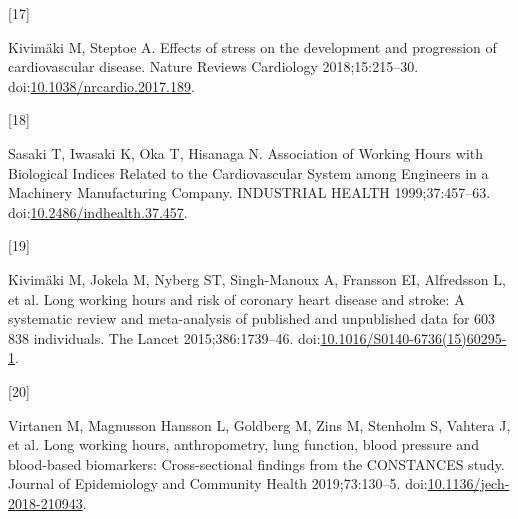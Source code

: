 \documentclass[]{elsarticle} %
\newlength{\cslhangindent}
\newlength{\csllabelwidth}
\newenvironment{CSLReferences}[2] %
 {%
  \setlength{\parindent}{0pt}
  \ifodd #1 \everypar{\setlength{\hangindent}{\cslhangindent}}\ignorespaces\fi
  \ifnum #2 > 0
  \setlength{\parskip}{#2\baselineskip}
  \fi
 }%
 {}
\newcommand{\CSLLeftMargin}[1]{\parbox[t]{\csllabelwidth}{#1}}
\newcommand{\CSLRightInline}[1]{\parbox[t]{\linewidth - \csllabelwidth}{#1}\break}
\begin{document}
\begin{CSLReferences}{0}{0}
\leavevmode{}%
\CSLLeftMargin{{[}17{]} }
\CSLRightInline{Kivimäki M, Steptoe A. Effects of stress on the
development and progression of cardiovascular disease. Nature Reviews
Cardiology 2018;15:215--30.
doi:\href{https://doi.org/10.1038/nrcardio.2017.189}{10.1038/nrcardio.2017.189}.}

\leavevmode{}%
\CSLLeftMargin{{[}18{]} }
\CSLRightInline{Sasaki T, Iwasaki K, Oka T, Hisanaga N. Association of
{Working Hours} with {Biological Indices Related} to the {Cardiovascular
System} among {Engineers} in a {Machinery Manufacturing Company}.
INDUSTRIAL HEALTH 1999;37:457--63.
doi:\href{https://doi.org/10.2486/indhealth.37.457}{10.2486/indhealth.37.457}.}

\leavevmode{}%
\CSLLeftMargin{{[}19{]} }
\CSLRightInline{Kivimäki M, Jokela M, Nyberg ST, Singh-Manoux A,
Fransson EI, Alfredsson L, et al. Long working hours and risk of
coronary heart disease and stroke: A systematic review and meta-analysis
of published and unpublished data for 603 838 individuals. The Lancet
2015;386:1739--46.
doi:\href{https://doi.org/10.1016/S0140-6736(15)60295-1}{10.1016/S0140-6736(15)60295-1}.}

\leavevmode{}%
\CSLLeftMargin{{[}20{]} }
\CSLRightInline{Virtanen M, Magnusson Hansson L, Goldberg M, Zins M,
Stenholm S, Vahtera J, et al. Long working hours, anthropometry, lung
function, blood pressure and blood-based biomarkers: Cross-sectional
findings from the {CONSTANCES} study. Journal of Epidemiology and
Community Health 2019;73:130--5.
doi:\href{https://doi.org/10.1136/jech-2018-210943}{10.1136/jech-2018-210943}.}

\end{CSLReferences}
\end{document}
